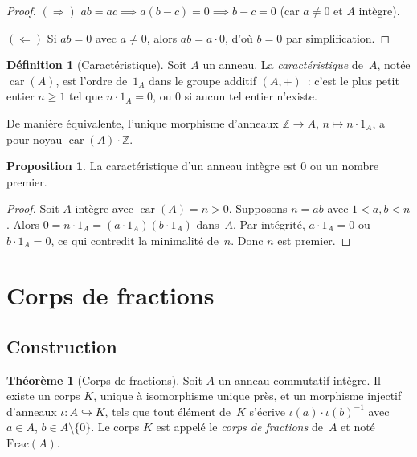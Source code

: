 \documentclass[12pt,a4paper,openany]{book}
\theoremstyle{definition}
\newtheorem{definition}{Définition}[chapter]
\newtheorem{theoreme}{Théorème}[chapter]
\newtheorem{proposition}{Proposition}[chapter]
\newcommand{\Z}{\mathbb{Z}}
\DeclareMathOperator{\car}{car}
\begin{document}
\begin{proof}
$(\Rightarrow)$\; $ab = ac \implies a(b - c) = 0 \implies b - c = 0$
(car $a \neq 0$ et $A$ intègre).

$(\Leftarrow)$\; Si $ab = 0$ avec $a \neq 0$, alors $ab = a \cdot 0$,
d'où $b = 0$ par simplification.
\end{proof}

\begin{definition}[Caractéristique]\label{def:caracteristique}
Soit $A$ un anneau. La \emph{caractéristique} de~$A$, notée
$\car(A)$\index{$\car(A)$}, est l'ordre de~$1_A$ dans le groupe additif
$(A,+)$~: c'est le plus petit entier $n \geqslant 1$ tel que
$n \cdot 1_A = 0$, ou $0$ si aucun tel entier n'existe.

De manière équivalente, l'unique morphisme d'anneaux $\Z \to A$,
$n \mapsto n \cdot 1_A$, a pour noyau $\car(A) \cdot \Z$.
\end{definition}

\begin{proposition}\label{prop:caract-integre}
La caractéristique d'un anneau intègre est $0$ ou un nombre premier.
\end{proposition}

\begin{proof}
Soit $A$ intègre avec $\car(A) = n > 0$. Supposons $n = ab$ avec
$1 < a, b < n$. Alors $0 = n \cdot 1_A = (a \cdot 1_A)(b \cdot 1_A)$
dans~$A$. Par intégrité, $a \cdot 1_A = 0$ ou $b \cdot 1_A = 0$, ce
qui contredit la minimalité de~$n$. Donc $n$ est premier.
\end{proof}

\section{Corps de fractions}\label{sec:corps-fractions}

\subsection{Construction}\label{subsec:construction-fractions}

\begin{theoreme}[Corps de fractions]\label{thm:corps-fractions}
Soit $A$ un anneau commutatif intègre. Il existe un corps $K$, unique à
isomorphisme unique près, et un morphisme injectif d'anneaux
$\iota \colon A \hookrightarrow K$, tels que tout élément de~$K$ s'écrive
$\iota(a) \cdot \iota(b)^{-1}$ avec $a \in A$, $b \in A \setminus \{0\}$.
Le corps $K$ est appelé le \emph{corps de fractions} de~$A$ et noté
$\mathrm{Frac}(A)$.
\end{theoreme}
\end{document}
